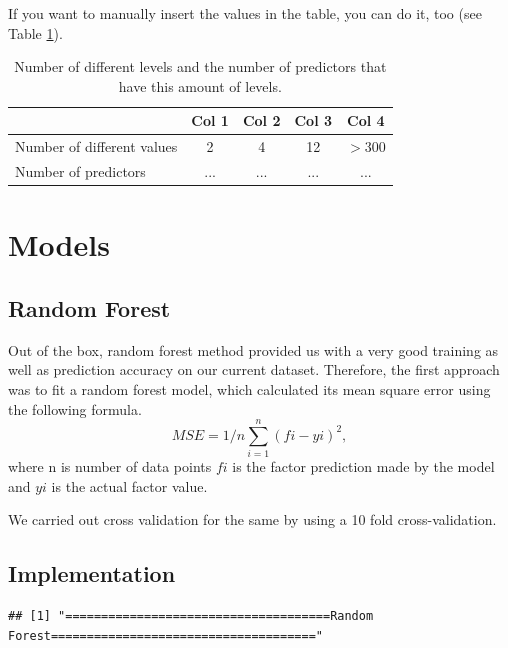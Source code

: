 \documentclass[
]{article}
\begin{document}
If you want to manually insert the values in the table, you can do it,
too (see Table \ref{tab:tab2}).

\begin{table}[H]
\caption{\label{tab:tab2}Number of different levels and the number of predictors that have this amount of levels.}
\centering
\begin{tabular}{lcccc}
\toprule
 & Col 1 & Col 2 & Col 3 & Col 4\\
\midrule
\rowcolor{gray!6}
Number of different values & 2 & 4 & 12 & $> 300$\\
Number of predictors & ... & ... & ... & ...\\
\bottomrule
\end{tabular}
\end{table}

\section{Models}

\subsection{Random Forest}

Out of the box, random forest method provided us with a very good
training as well as prediction accuracy on our current dataset.
Therefore, the first approach was to fit a random forest model, which
calculated its mean square error using the following formula. \[
  MSE = 1/n \sum_{i=1}^n (fi-yi)^2,
\] where n is number of data points \(fi\) is the factor prediction made
by the model and \(yi\) is the actual factor value.

We carried out cross validation for the same by using a 10 fold
cross-validation.

\subsection{Implementation}

\begin{verbatim}
## [1] "=====================================Random Forest====================================="
\end{verbatim}
\end{document}
